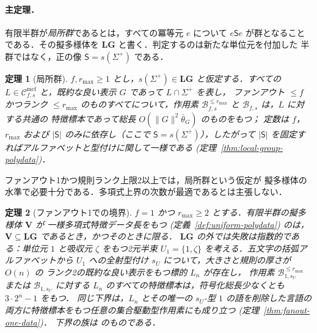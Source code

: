 \documentclass[11pt,a4paper]{ltjsarticle}
\numberwithin{equation}{section}
\theoremstyle{plain}
\theoremstyle{definition}
\theoremstyle{remark}
\newcommand{\Cmcf}[2]{\mathcal{C}^{\mathrm{mcf}}_{#1,#2}}
\theoremstyle{plain}
\newtheorem{mainthm}{定理}
\begin{document}
\paragraph{主定理．}
有限半群が\emph{局所群}であるとは，すべての冪等元 $e$ について
$e\mathsf Se$ が群となることである．その擬多様体を
$\mathbf{LG}$ と書く．判定するのは新たな単位元を付加した
半群ではなく，正の像 $\mathsf S=s(\Sigma^+)$ である．

\begin{mainthm}[局所群]
\label{thm:A}
$f,r_{\max}\ge1$ とし，$s(\Sigma^+)\in\mathbf{LG}$ と仮定する．すべての
$L\in\Cmcf{f}{s}$ と，既約な良い表示 $G$ であって $L\cap\Sigma^+$ を表し，
ファンアウト $\le f$ かつランク $\le r_{\max}$ のものすべてについて，作用素
$\mathcal B^{\le r_{\max}}_{f,s}$ と $\mathcal B_{f,s}$ は，$L$ に対する共通の
特徴標本であって総長 $O(\|G\|^2\bar\theta_G)$ のものをもつ；
定数は $f$，$r_{\max}$ および $|\mathsf S|$ のみに依存し（ここで
$\mathsf S=s(\Sigma^+)$），したがって $|\mathsf S|$ を固定すればアルファベットと型付けに関して一様である
\textup(定理~\ref{thm:local-group-polydata}\textup)．
\end{mainthm}

ファンアウト1かつ規則ランク上限2以上では，局所群という仮定が
擬多様体の水準で必要十分である．多項式上界の次数が最適であるとは主張しない．

\begin{mainthm}[ファンアウト1での境界]
\label{thm:C}
$f=1$ かつ $r_{\max}\ge2$ とする．有限半群の擬多様体 $\mathbf V$ が
一様多項式特徴データ長をもつ
\textup(定義~\ref{def:uniform-polydata}\textup) のは，
$\mathbf V\subseteq\mathbf{LG}$ であるとき，かつそのときに限る．
$\mathbf{LG}$ の外では失敗は指数的である：単位元 $1$ と吸収元 $\zeta$
をもつ2元半束 $U_1=\{1,\zeta\}$ を考える．五文字の括弧アルファベットから
$U_1$ への全射型付け $s_U$ について，大きさと規則の厚さが $O(n)$ の
ランク2の既約な良い表示をもつ標的 $L_n$ が存在し，
作用素 $\mathcal B^{\le r_{\max}}_{1,s_U}$ または $\mathcal B_{1,s_U}$ に対する
$L_n$ のすべての特徴標本は，符号化総長少なくとも $3\cdot2^n-1$ をもつ．
同じ下界は，$L_n$ とその唯一の $s_U$-型 $1$ の語を削除した言語の
両方に特徴標本をもつ任意の集合駆動型作用素にも成り立つ
\textup(定理~\ref{thm:fanout-one-data}\textup)．
下界の族は \cite[Proposition~6.4]{kuriyamaCFG} のものである．
\end{mainthm}
\end{document}
